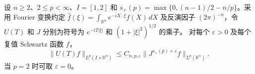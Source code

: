 设 \(n\ge2\)、\(2\le p<\infty\)、\(I=[1,2]\) 和 \(s_+(p)=\max\{0,(n-1)/2-n/p\}\)。采用 Fourier 变换约定
\(\widehat f(\xi)=\int_{\mathbb R^n}e^{-iX\cdot\xi}f(X)\,dX\)
及反演因子 \((2\pi)^{-n}\)，令 \(U(T)\) 和 \(J\) 分别为符号为 \(e^{-iT|\xi|}\) 和 \((1+|\xi|^2)^{1/2}\) 的乘子。
对每个 \(\varepsilon>0\) 及每个复值 Schwartz 函数 \(f\)，
\[
 \|U(T)f\|_{L^p(I\times\mathbb R^n)}
 \le C_{n,p,\varepsilon}\|J^{s_+(p)+\varepsilon}f\|_{L^p(\mathbb R^n)}.
\]
当 \(p=2\) 时可取 \(\varepsilon=0\)。
